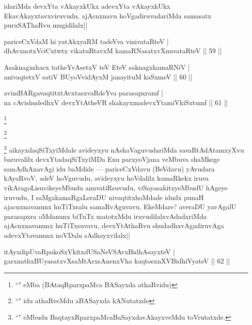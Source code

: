 \begin{artha}
idariMda devxYta vAkayxkUkx adevxYta vAkayxkUkx EkavAkayxtavxviruvudu, ajAcnxnavu hoVgadiruvadariMda samasatx puruSAThaRvu mugidilalx|| 
\end{artha}

\begin{shl}
pariceCxVdaM hi yatAkxyaRM tadeVva vinivataRteV |\\
dhAvxnotxVciCxtwtx vikatuRtavxM kamaRNasatxvXnuvataRteV \hfill || 59 ||
\end{shl}

\begin{shl}
Asaknagxshacx tatheYvA\s \s setxV teV EteV saknagxkamaRNiV |\\
anivaqtetxV satiV BUyoV\s vidAyxM janayituM kaSxmeV \hfill || 60 ||
\end{shl}

\begin{shl}
aviniBARgavaqtitxtAvxtasxvaRdeYva parasapxramf |\\
na cAvishudedhxV devxYtAtheVR shakayxmadevxYtamiVkiSxtumf \hfill || 61 ||
\end{shl}

\begin{artha}
\footnote{``\stext" eMba (BAtaqRparxpaMca BASayxda athaRvidu)}
\end{artha}

\begin{artha}
\footnote{``\stext" idu athaRveMdu aBASayxda kANutatxde }
\end{artha}

\begin{artha}
\footnote{``\stext" eMbudu BaqtayxRparxpaMcaBaSayxdavAkayxveMdu toVrutatxde.} aikayxdaqSiTxyiMdale avideyxyu nAshaVaguvudariMda savaRtAdAtamxyXvu baruvalilx devxYtadaqSiTxyiMDa Enu parxyoVjana veMbuva shaMkege samAdhAnavAgi idu baMdide --- pariceCxVdavu (BeVdavu) yAvudara kAyaRvoV, adeV hoVguvudu, avideyxyu hoVdalilx kamaRkekx iruva vikAragoLisuvikeyeMbudu anuvatiRsuvudu, viSayasakitxyeMbudU hAgeye iruvudu, I saMgakamaRgaLeraDU nivaqtitxhoMdade idudx punaH ajacnxnavanunx huTiTxsalu samaRvAguvavu, EkeMdare? averaDU yavAgalU parasapxra oMdanunx biTuTx matotxMdu iruvudilalxvAdadxriMda ajAcnxnavanunx huTiTxsuvavu, devxYtAthaRvu shudadhxvAgadiruvAga adevxYtavanunx noVDalu sAdhayxvilalx||
\end{artha}

\begin{shl}
itAyxdipUvaRpakoSxVkitxdUSaNeVSAvxBidhAsayxteV |\\
garxnathxBUyasatxvXsaMtArxsAnenxVha kaqtosxnXV\s BidhiVyateV \hfill || 62 ||
\end{shl}

